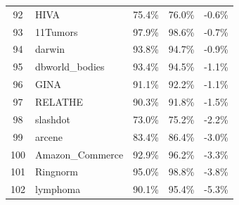 \documentclass[preprint,12pt,authoryear]{elsarticle}
\begin{document}
{\begin{longtable}{|c|p{4.5cm}|c|c|c|}
92 & HIVA & 75.4\% & 76.0\% & -0.6\% \\
93 & 11Tumors & 97.9\% & 98.6\% & -0.7\% \\
94 & darwin & 93.8\% & 94.7\% & -0.9\% \\
95 & dbworld\_bodies & 93.4\% & 94.5\% & -1.1\% \\
96 & GINA & 91.1\% & 92.2\% & -1.1\% \\
97 & RELATHE & 90.3\% & 91.8\% & -1.5\% \\
98 & slashdot & 73.0\% & 75.2\% & -2.2\% \\
99 & arcene & 83.4\% & 86.4\% & -3.0\% \\
100 & Amazon\_Commerce & 92.9\% & 96.2\% & -3.3\% \\
101 & Ringnorm & 95.0\% & 98.8\% & -3.8\% \\
102 & lymphoma & 90.1\% & 95.4\% & -5.3\% \\
\end{longtable}
} %





\end{document}
